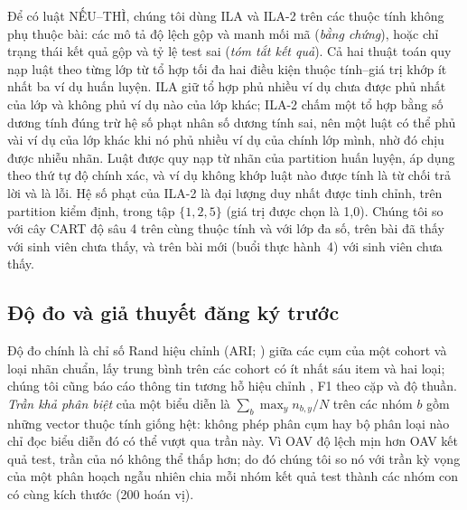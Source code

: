 \documentclass[a4paper,preprint,12pt,authoryear]{elsarticle}
\begin{document}
Để có luật NẾU--THÌ, chúng tôi dùng ILA \citep{tolun1998ila} và ILA-2 \citep{tolun1999ila2} trên các thuộc tính không phụ thuộc bài: các mô tả độ lệch gộp và manh mối mã (\emph{bằng chứng}), hoặc chỉ trạng thái kết quả gộp và tỷ lệ test sai (\emph{tóm tắt kết quả}). Cả hai thuật toán quy nạp luật theo từng lớp từ tổ hợp tối đa hai điều kiện thuộc tính--giá trị khớp ít nhất ba ví dụ huấn luyện. ILA giữ tổ hợp phủ nhiều ví dụ chưa được phủ nhất của lớp và không phủ ví dụ nào của lớp khác; ILA-2 chấm một tổ hợp bằng số dương tính đúng trừ hệ số phạt nhân số dương tính sai, nên một luật có thể phủ vài ví dụ của lớp khác khi nó phủ nhiều ví dụ của chính lớp mình, nhờ đó chịu được nhiễu nhãn. Luật được quy nạp từ nhãn của partition huấn luyện, áp dụng theo thứ tự độ chính xác, và ví dụ không khớp luật nào được tính là từ chối trả lời và là lỗi. Hệ số phạt của ILA-2 là đại lượng duy nhất được tinh chỉnh, trên partition kiểm định, trong tập $\{1,2,5\}$ (giá trị được chọn là 1,0). Chúng tôi so với cây CART độ sâu 4 trên cùng thuộc tính và với lớp đa số, trên bài đã thấy với sinh viên chưa thấy, và trên bài mới (buổi thực hành~4) với sinh viên chưa thấy.

\subsection{Độ đo và giả thuyết đăng ký trước}\label{sec:hyp}
Độ đo chính là chỉ số Rand hiệu chỉnh (ARI; \citealt{hubert1985ari}) giữa các cụm của một cohort và loại nhãn chuẩn, lấy trung bình trên các cohort có ít nhất sáu item và hai loại; chúng tôi cũng báo cáo thông tin tương hỗ hiệu chỉnh \citep{vinh2010ami}, F1 theo cặp và độ thuần. \emph{Trần khả phân biệt} của một biểu diễn là $\sum_b \max_y n_{b,y}/N$ trên các nhóm $b$ gồm những vector thuộc tính giống hệt: không phép phân cụm hay bộ phân loại nào chỉ đọc biểu diễn đó có thể vượt qua trần này. Vì OAV độ lệch mịn hơn OAV kết quả test, trần của nó không thể thấp hơn; do đó chúng tôi so nó với trần kỳ vọng của một phân hoạch ngẫu nhiên chia mỗi nhóm kết quả test thành các nhóm con có cùng kích thước (200 hoán vị).
\end{document}
